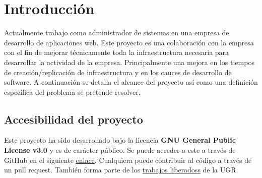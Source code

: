\chapter {Introducción}
	\begin{paragraph}
		Actualmente trabajo como administrador de sistemas en una empresa de desarrollo de aplicaciones web. Este proyecto es una colaboración con la empresa con el fin de mejorar técnicamente toda la infraestructura necesaria para desarrollar la actividad de la empresa. Principalmente una mejora en los tiempos de creación/replicación de infraestructura y en los cauces de desarrollo de software. A continuación se detalla el alcance del proyecto así como una definición específica del problema se pretende resolver.
	\end{paragraph}

\section{Accesibilidad del proyecto}
\begin{text}
	Este proyecto ha sido desarrollado bajo la licencia \textbf{GNU General Public License v3.0} y es de carácter público. Se puede acceder a este a través de GitHub en el siguiente \href{https://github.com/VictorMorenoJimenez/tfg2020}{enlace}. Cualquiera puede contribuir al código a través de un pull request. También forma parte de los \href{https://github.com/JJ/TF-libres-UGR}{trabajos liberadoss} de la UGR.
\end{text}
